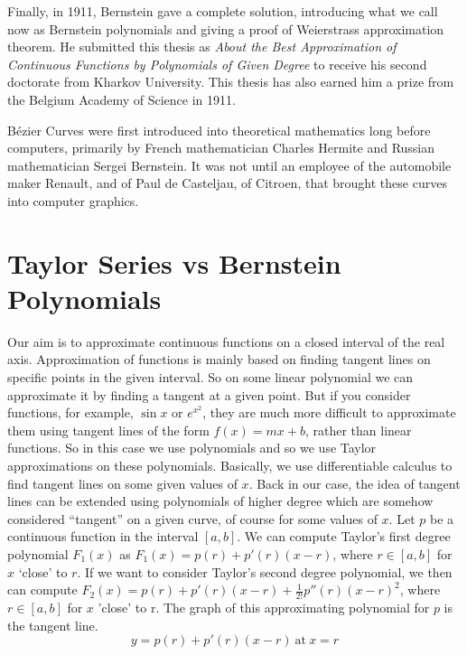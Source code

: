 \documentclass{article}
\begin{document}
Finally, in 1911, Bernstein gave a complete solution, introducing what we call now as Bernstein polynomials and giving a proof of Weierstrass approximation theorem.
He submitted this thesis as \textit{About the Best Approximation of Continuous Functions by Polynomials of Given Degree} to receive his second doctorate from Kharkov University.
This thesis has also earned him a prize from the Belgium Academy of Science in 1911.\cite{o'connor_robertson_2010}

B\'ezier Curves were first introduced into theoretical mathematics long before computers, primarily by French mathematician Charles Hermite and Russian mathematician Sergei Bernstein.
It was not until an employee of the automobile maker Renault, and of Paul de Casteljau, of Citroen, that brought these curves into computer graphics.\cite{farouki2012bernstein}
\section{Taylor Series vs Bernstein Polynomials}\label{sec:tsvsbp}
Our aim is to approximate continuous functions on a closed interval of the real axis. Approximation of functions is mainly based on finding tangent lines on specific points in the given interval. So on some linear polynomial we can approximate it by finding a tangent at a given point. But if you consider functions, for example, $\sin x$ or  $e^{x^2} $, they are much more difficult to approximate them using tangent lines of the form $f(x) =mx+b$, rather than linear functions. So in this case we use polynomials and so we use Taylor approximations on these polynomials. Basically, we use differentiable calculus to find tangent lines on some given values of $x$. Back in our case, the idea of tangent lines can be extended using polynomials of higher degree which are somehow considered ``tangent'' on a given curve, of course for some values of $x$.
Let $p$ be a continuous function in the interval $[a,b]$.
We can compute Taylor’s first degree polynomial $F_1(x)$ as $F_1(x)=p(r) + p'(r) (x - r)$, where $r \in [a,b]$ for $x$ `close' to $r$.
If we want to consider Taylor’s second degree polynomial, we then can compute $F_2(x)= p(r) + p '(r) (x - r)+ \frac{1}{2!}p''(r) (x - r)^2$, where $r \in [a,b]$ for $x$ 'close' to r.
The graph of this approximating polynomial for $p$ is the tangent line.
\begin{equation*}
    y=p(r)+p'(r)(x-r) \ \text{at}\ x=r
\end{equation*}
\end{document}
